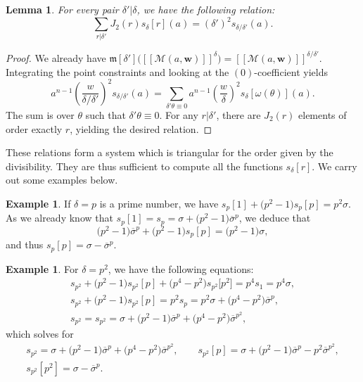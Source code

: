 \documentclass[pdftex]{sigma}
\newcommand{\fvir}[2]{[\![ #1 ]\!]^{#2}}
\newcommand{\m}[1]{\mfk\left[ #1 \right]}
\newcommand{\bfw}{ {\boldsymbol w} }
\newcommand{\mfk}{\mathfrak{m}}
\newcommand{\M}{\mathcal{M}}
\numberwithin{equation}{section}
\newtheorem{lem}[theo]{Lemma}
\theoremstyle{definition}
\newtheorem{expl}[theo]{Example}
\begin{document}
\begin{lem}\label{lem-relation-sdelta}
For every pair $\delta'|\delta$, we have the following relation:
\[ \sum_{r|\delta'}J_2(r)s_\delta[r](a) = (\delta')^2s_{\delta/\delta'}(a). \]
\end{lem}

\begin{proof}
We already have $\m{\delta'}\bigl(\fvir{\M(a,\bfw)}{\delta}\bigr)=\fvir{\M(a,\bfw)}{\delta/\delta'}$. Integrating the point constraints and looking at the $(0)$-coefficient yields
\[ a^{n-1}\left(\frac{w}{\delta/\delta'}\right)^2 s_{\delta/\delta'}(a) = \sum_{\delta'\theta\equiv 0}a^{n-1}\left(\frac{w}{\delta}\right)^2s_\delta[\omega(\theta)](a). \]
The sum is over $\theta$ such that $\delta'\theta\equiv 0$. For any $r|\delta'$, there are $J_2(r)$ elements of order exactly $r$, yielding the desired relation.
\end{proof}

These relations form a system which is triangular for the order given by the divisibility. They are thus sufficient to compute all the functions $s_\delta[r]$. We carry out some examples below.

\begin{expl}
If $\delta=p$ is a prime number, we have
$s_p[1]+\bigl(p^2-1\bigr)s_p[p] =p^2\sigma$.
As we already know that $s_p[1]=s_p=\sigma+\bigl(p^2-1\bigr)\overline{\sigma}^p$, we deduce that
\[ \bigl(p^2-1\bigr)\overline{\sigma}^p+\bigl(p^2-1\bigr)s_p[p] = \bigl(p^2-1\bigr)\sigma, \]
and thus
$s_p[p]=\sigma-\overline{\sigma}^p$.
\end{expl}

\begin{expl}
For $\delta=p^2$, we have the following equations:
\begin{gather*}
 s_{p^2}+\bigl(p^2-1\bigr)s_{p^2}[p]+\bigl(p^4-p^2\bigr)s_{p^2}\big[p^2\big] = p^4s_1 =p^4\sigma, \\
 s_{p^2}+\bigl(p^2-1\bigr)s_{p^2}[p] = p^2s_p =p^2\sigma+\bigl(p^4-p^2\bigr)\overline{\sigma}^p, \\
 s_{p^2} = s_{p^2} = \sigma+\bigl(p^2-1\bigr)\overline{\sigma}^p+\bigl(p^4-p^2\bigr)\overline{\sigma}^{p^2},
 \end{gather*}
 which solves for
\begin{gather*}
 s_{p^2} = \sigma+\bigl(p^2-1\bigr)\overline{\sigma}^p+\bigl(p^4-p^2\bigr)\overline{\sigma}^{p^2}, \qquad
 s_{p^2}[p] = \sigma+\bigl(p^2-1\bigr)\overline{\sigma}^p -p^2\overline{\sigma}^{p^2}, \\
 s_{p^2}[p^2] = \sigma-\overline{\sigma}^p.
 \end{gather*}
\end{expl}
\end{document}
